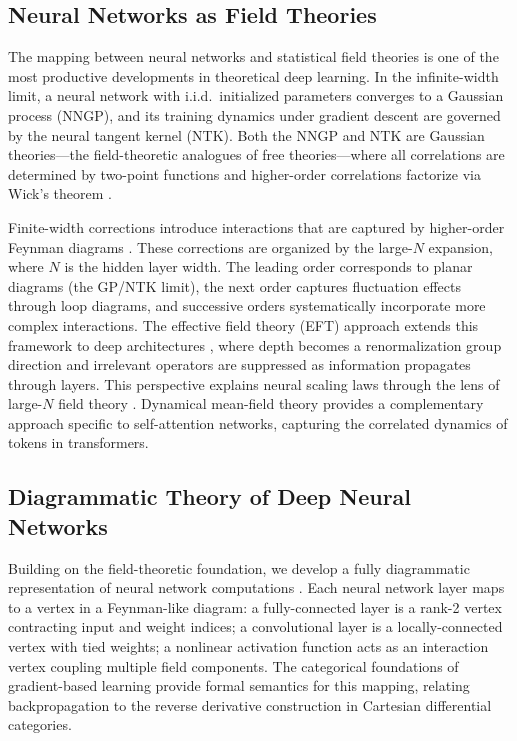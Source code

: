 \documentclass[12pt,a4paper]{article}
\begin{document}
\subsection{Neural Networks as Field Theories}

The mapping between neural networks and statistical field theories is one of the most productive developments in theoretical deep learning. In the infinite-width limit, a neural network with i.i.d.\ initialized parameters converges to a Gaussian process (NNGP), and its training dynamics under gradient descent are governed by the neural tangent kernel (NTK). Both the NNGP and NTK are Gaussian theories---the field-theoretic analogues of free theories---where all correlations are determined by two-point functions and higher-order correlations factorize via Wick's theorem \cite{neural2024neural}.

Finite-width corrections introduce interactions that are captured by higher-order Feynman diagrams \cite{guillen2025finitewidth}. These corrections are organized by the large-$N$ expansion, where $N$ is the hidden layer width. The leading order corresponds to planar diagrams (the GP/NTK limit), the next order captures fluctuation effects through loop diagrams, and successive orders systematically incorporate more complex interactions. The effective field theory (EFT) approach extends this framework to deep architectures \cite{banta2024structures}, where depth becomes a renormalization group direction and irrelevant operators are suppressed as information propagates through layers. This perspective explains neural scaling laws through the lens of large-$N$ field theory \cite{neural2025neural}. Dynamical mean-field theory \cite{tiberi2024dynamical} provides a complementary approach specific to self-attention networks, capturing the correlated dynamics of tokens in transformers.

\subsection{Diagrammatic Theory of Deep Neural Networks}

Building on the field-theoretic foundation, we develop a fully diagrammatic representation of neural network computations \cite{crescenzi2024towards}. Each neural network layer maps to a vertex in a Feynman-like diagram: a fully-connected layer is a rank-2 vertex contracting input and weight indices; a convolutional layer is a locally-connected vertex with tied weights; a nonlinear activation function acts as an interaction vertex coupling multiple field components. The categorical foundations of gradient-based learning \cite{cruttwell2022categorical} provide formal semantics for this mapping, relating backpropagation to the reverse derivative construction in Cartesian differential categories.
\end{document}

